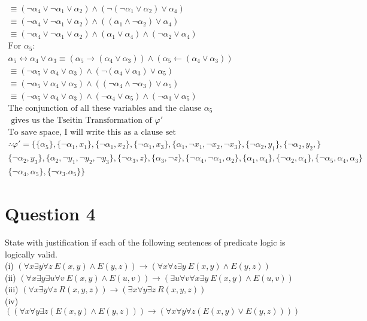 \documentclass[12pt]{fphw}
\begin{document}
\begin{gather*}
  \equiv (\neg \alpha_4 \vee \neg \alpha_1 \vee \alpha_2) \wedge (\neg(\neg \alpha_1 \vee \alpha_2) \vee \alpha_4) \\
  \equiv (\neg \alpha_4 \vee \neg \alpha_1 \vee \alpha_2) \wedge ((\alpha_1 \wedge \neg \alpha_2) \vee \alpha_4) \\
  \equiv (\neg \alpha_4 \vee \neg \alpha_1 \vee \alpha_2) \wedge (\alpha_1 \vee \alpha_4) \wedge (\neg \alpha_2 \vee \alpha_4) \\
  \text{For } \alpha_5: \\
  \alpha_5 \leftrightarrow \alpha_4 \vee \alpha_3 \equiv (\alpha_5 \to (\alpha_4 \vee \alpha_3)) \wedge (\alpha_5 \leftarrow (\alpha_4 \vee \alpha_3)) \\
  \equiv (\neg \alpha_5 \vee \alpha_4 \vee \alpha_3) \wedge (\neg(\alpha_4 \vee \alpha_3) \vee \alpha_5) \\
  \equiv (\neg \alpha_5 \vee \alpha_4 \vee \alpha_3) \wedge ((\neg \alpha_4 \wedge \neg \alpha_3) \vee \alpha_5) \\
  \equiv (\neg \alpha_5 \vee \alpha_4 \vee \alpha_3) \wedge (\neg \alpha_4 \vee \alpha_5) \wedge (\neg \alpha_3 \vee \alpha_5) \\
  \text{The conjunction of all these variables and the clause } \alpha_5 \\
  \text{ gives us the Tseitin Transformation of } \varphi' \\
  \text{To save space, I will write this as a clause set} \\
  \therefore \varphi' = \{\{\alpha_5\}, \{\neg \alpha_1, x_1\}, \{\neg \alpha_1, x_2\}, \{\neg \alpha_1, x_3\}, \{\alpha_1, \neg x_1, \neg x_2, \neg x_3\}, \{\neg \alpha_2, y_1\}, \{\neg \alpha_2, y_2,\} \\ \{\neg \alpha_2, y_3\}, \{\alpha_2, \neg y_1, \neg y_2, \neg y_3\}, \{\neg \alpha_3, z\}, \{\alpha_3, \neg z\}, \{\neg \alpha_4, \neg \alpha_1, \alpha_2\}, \{\alpha_1, \alpha_4\}, \{\neg \alpha_2, \alpha_4\}, \{\neg \alpha_5, \alpha_4, \alpha_3\} \\ \{\neg \alpha_4, \alpha_5\}, \{\neg \alpha_3. \alpha_5\}\}
\end{gather*}

\section*{Question 4}

\begin{problem}
  State with justification if each of the following sentences of predicate logic is logically valid. \\
  (i) $(\forall x \exists y \forall z \ E(x,y) \wedge E(y,z)) \to (\forall x \forall z \exists y \ E(x,y) \wedge E(y,z))$ \\
  (ii) $(\forall x \exists y \exists u \forall v \ E(x,y) \wedge E(u,v)) \to (\exists u \forall v \forall x \exists y \ E(x,y) \wedge E(u,v))$ \\
  (iii) $(\forall x \exists y \forall z \ R(x,y,z)) \to (\exists x \forall y \exists z \ R(x,y,z))$ \\
  (iv) $((\forall x \forall y \exists z (E(x,y) \wedge E(y,z))) \to (\forall x \forall y \forall z (E(x,y) \vee E(y,z))))$
\end{problem}
\end{document}
